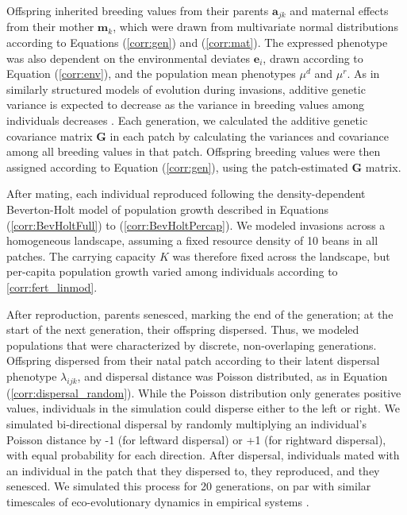 \documentclass[11pt]{article}
\begin{document}
Offspring inherited breeding values from their parents $\bm{a}_{jk}$ and maternal effects from their mother $\bm{m}_{k}$, which were drawn from multivariate normal distributions according to Equations (\ref{corr:gen}) and (\ref{corr:mat}).
The expressed phenotype was also dependent on the environmental deviates $\bm{e}_{i}$, drawn according to Equation (\ref{corr:env}), and the population mean phenotypes $\mu^{d}$ and $\mu^{r}$.
As in similarly structured models of evolution during invasions, additive genetic variance is expected to decrease as the variance in breeding values among individuals decreases \citep{phillips_evolutionary_2015}.
Each generation, we calculated the additive genetic covariance matrix $\bm{G}$ in each patch by calculating the variances and covariance among all breeding values in that patch.
Offspring breeding values were then assigned according to Equation (\ref{corr:gen}), using the patch-estimated $\bm{G}$ matrix.

After mating, each individual reproduced following the density-dependent Beverton-Holt model of population growth described in Equations (\ref{corr:BevHoltFull}) to (\ref{corr:BevHoltPercap}).
We modeled invasions across a homogeneous landscape, assuming a fixed resource density of 10 beans in all patches. The carrying capacity $K$ was therefore fixed across the landscape, but per-capita population growth varied among individuals according to \ref{corr:fert_linmod}.

After reproduction, parents senesced, marking the end of the generation; at the start of the next generation, their offspring dispersed.
Thus, we modeled populations that were characterized by discrete, non-overlaping generations.
Offspring dispersed from their natal patch according to their latent dispersal phenotype $\lambda_{ijk}$, and dispersal distance was Poisson distributed, as in Equation (\ref{corr:dispersal_random}).
While the Poisson distribution only generates positive values, individuals in the simulation could disperse either to the left or right. We simulated bi-directional dispersal by randomly multiplying an individual's Poisson distance by -1 (for leftward dispersal) or +1 (for rightward dispersal), with equal probability for each direction.
After dispersal, individuals mated with an individual in the patch that they dispersed to, they reproduced, and they senesced.
We simulated this process for 20 generations, on par with similar timescales of eco-evolutionary dynamics in empirical systems \citep{williams_rapid_2016,ochocki_rapid_2017,weiss-lehman_rapid_2017}.
\end{document}
